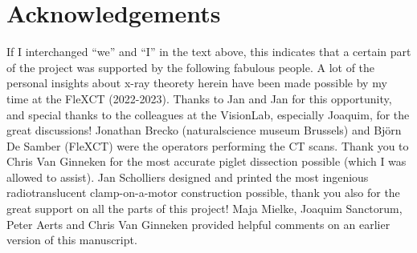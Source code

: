 \section{Acknowledgements}
\label{sec:org4d95d45}
If I interchanged ``we'' and ``I'' in the text above, this indicates that a certain part of the project was supported by the following fabulous people.
A lot of the personal insights about x-ray theorety herein have been made possible by my time at the FleXCT (2022-2023). Thanks to Jan and Jan for this opportunity, and special thanks to the colleagues at the VisionLab, especially Joaquim, for the great discussions!
Jonathan Brecko (naturalscience museum Brussels) and Björn De Samber (FleXCT) were the operators performing the CT scans.
Thank you to Chris Van Ginneken for the most accurate piglet dissection possible (which I was allowed to assist).
Jan Scholliers designed and printed the most ingenious radiotranslucent clamp-on-a-motor construction possible, thank you also for the great support on all the parts of this project!
Maja Mielke, Joaquim Sanctorum, Peter Aerts and Chris Van Ginneken provided helpful comments on an earlier version of this manuscript.
